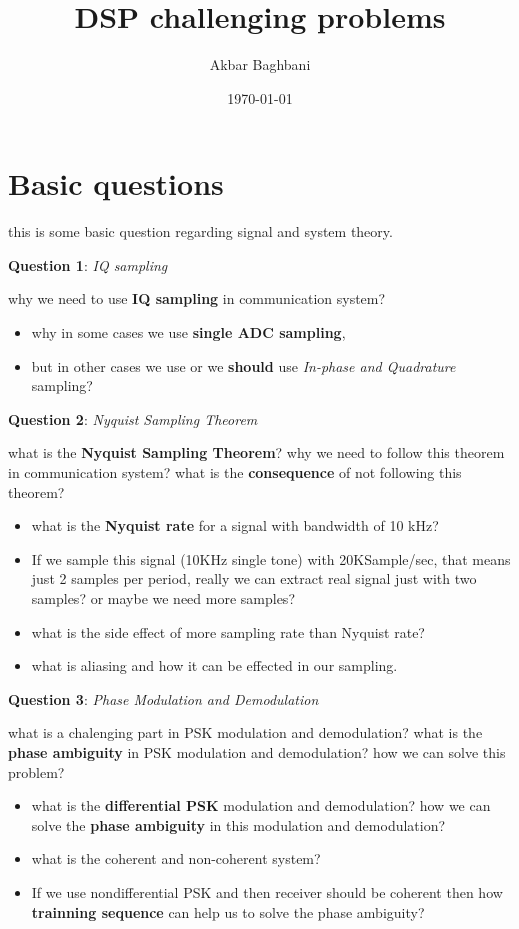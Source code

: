 \documentclass{article} %
\newcommand{\question}[2][]{\begin{flushleft}
    \textbf{Question #1}: \textit{#2}
\end{flushleft}}
\begin{document}
\title{DSP challenging problems}
\author{Akbar Baghbani}
\date{\today}
\maketitle

\tableofcontents
\newpage
{}
    
\section{Basic questions}
    this is some basic question regarding signal and system theory.
    
    \question[1]{IQ sampling}
    why we need to use \textbf{IQ sampling} in communication system? 
    \begin{itemize}
        \item why in some cases we use \textbf{single ADC sampling}, 
        \item but in other cases we use or we \textbf{should} use \emph{In-phase and Quadrature} sampling?
    \end{itemize}

    \question[2]{Nyquist Sampling Theorem}
    what is the \textbf{Nyquist Sampling Theorem}? why we need to follow this theorem in communication system? what is the \textbf{consequence} of not following this theorem?
    \begin{itemize}
        \item what is the \textbf{Nyquist rate} for a signal with bandwidth of 10 kHz?
        \item If we sample this signal (10KHz single tone) with 20KSample/sec, that means just 2 samples per period, really we can extract real signal just with two samples? or maybe we need more samples?
        \item what is the side effect of more sampling rate than Nyquist rate?
        \item what is aliasing and how it can be effected in our sampling.
    \end{itemize}

    \question[3]{Phase Modulation and Demodulation}
    what is a chalenging part in PSK modulation and demodulation? what is the \textbf{phase ambiguity} in PSK modulation and demodulation? how we can solve this problem?
    \begin{itemize}
        \item what is the \textbf{differential PSK} modulation and demodulation? how we can solve the \textbf{phase ambiguity} in this modulation and demodulation?
        \item what is the coherent and non-coherent system?
        \item If we use nondifferential PSK and then receiver should be coherent then how \textbf{trainning sequence} can help us to solve the phase ambiguity?
    \end{itemize}
\end{document}
